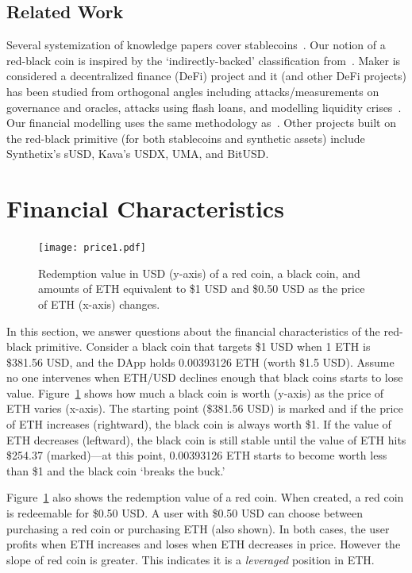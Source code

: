 \subsection{Related Work} Several systemization of knowledge papers cover stablecoins~\cite{PHP+19,MSS20,CDM20}. Our notion of a red-black coin is inspired by the `indirectly-backed' classification from~\cite{CDM20}. Maker is considered a decentralized finance (DeFi) project and it (and other DeFi projects) has been studied from orthogonal angles including attacks/measurements on governance and oracles, attacks using flash loans, and modelling liquidity crises~\cite{GRB20,GPH+20,QZLG20,KMM20}. Our financial modelling uses the same methodology as~\cite{GPH+20}. Other projects built on the red-black primitive (for both stablecoins and synthetic assets) include Synthetix's sUSD, Kava's USDX, UMA, and BitUSD. 


\section{Financial Characteristics}

\begin{figure}[t]
\centering
\texttt{[image: price1.pdf]}
\caption{Redemption value in USD (y-axis) of a red coin, a black coin, and amounts of ETH equivalent to \$1 USD and \$0.50 USD as the price of ETH (x-axis) changes.\label{fig:price1}}
\end{figure}

In this section, we answer questions about the financial characteristics of the red-black primitive. Consider a black coin that targets \$1 USD when 1 ETH is \$381.56 USD, and the DApp holds 0.00393126 ETH (worth \$1.5 USD).  Assume no one intervenes when ETH/USD declines enough that black coins starts to lose value. Figure~\ref{fig:price1} shows how much a black coin is worth (y-axis) as the price of ETH varies (x-axis). The starting point (\$381.56 USD) is marked and if the price of ETH increases (rightward), the black coin is always worth \$1. If the value of ETH decreases (leftward), the black coin is still stable until the value of ETH hits \$254.37 (marked)---at this point, 0.00393126 ETH starts to become worth less than \$1 and the black coin `breaks the buck.'

Figure~\ref{fig:price1} also shows the redemption value of a red coin. When created, a red coin is redeemable for \$0.50 USD. A user with \$0.50 USD can choose between purchasing a red coin or purchasing ETH (also shown). In both cases, the user profits when ETH increases and loses when ETH decreases in price. However the slope of red coin is greater. This indicates it is a \emph{leveraged} position in ETH.  

